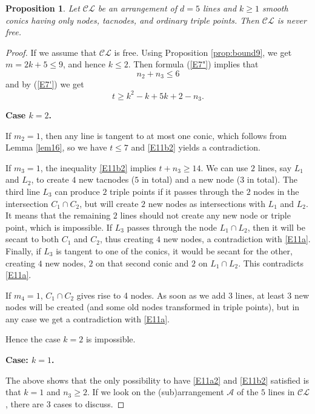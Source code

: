 \documentclass[12pt]{amsart}
\theoremstyle{plain}
\newtheorem{prop}[subsection]{Proposition}
\theoremstyle{definition}
\numberwithin{equation}{section}
\begin{document}
\begin{prop}
\label{prop11b}
Let $\mathcal{CL}$ be an arrangement of $d=5$ lines and $k \geq 1$ smooth conics having only nodes, tacnodes, and ordinary triple points. Then $\mathcal{CL}$  is never free.
\end{prop}
\begin{proof}
If we assume that $\mathcal{CL}$ is free. Using Proposition \ref{prop:bound9}, we get $m = 2k+5 \leq 9$, and hence $k\leq 2$.
Then formula (\ref{E7"}) implies that
\begin{equation}
\label{E11a2}
n_2+ n_3 \leq 6
\end{equation}
and by (\ref{E7'}) we get
\begin{equation}
\label{E11b2}
t \geq k^2-k+5k+2-n_3.
\end{equation}

\medskip

{\bf Case $k=2$.}

\medskip

If $m_2=1$, then any line is tangent to at most one conic, which follows from Lemma \ref{lem16}, so we have $t \leq 7$ and \eqref{E11b2} yields a contradiction.

If $m_3=1$, the inequality \eqref{E11b2} implies $t + n_3 \geq 14$.
We can use $2$ lines, say $L_1$ and $L_2$, to create $4$ new tacnodes ($5$ in total) and a new node ($3$ in total). The third line $L_3$ can produce $2$ triple points if it passes through the $2$ nodes in the intersection $C_1 \cap C_2$, but will create $2$ new nodes as intersections with $L_1$ and $L_2$. It means that the remaining $2$ lines should not create any new node or triple point, which is impossible.  If $L_3$ passes through the node $L_1\cap L_2$, then it will be secant to both $C_1$ and $C_2$, thus creating 
$4$ new nodes, a contradiction with \eqref{E11a}.
Finally, if $L_3$ is tangent to one of the conics, it would be secant for the other, creating $4$ new nodes, $2$ on that second conic and $2$ on $L_1 \cap L_2$. This contradicts \eqref{E11a}.

If $m_4=1$, $C_1\cap C_2$ gives rise to 4 nodes. As soon as we add $3$ lines, at least $3$ new nodes will be created (and some old nodes transformed in triple points), but in any case we get a contradiction with \eqref{E11a}.

Hence the case $k=2$ is impossible.
\medskip

{\bf Case: $k=1$.}

\medskip
The above shows that the only possibility to have \eqref{E11a2} and \eqref{E11b2} satisfied is that $k=1$ and $n_3 \geq 2$.
If we look on the (sub)arrangement $\mathcal{A}$ of the $5$ lines in $\mathcal{CL}$, there are $3$ cases to discuss.


\end{proof}
\end{document}
